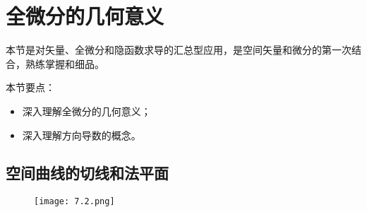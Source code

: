 \section{全微分的几何意义}

本节是对矢量、全微分和隐函数求导的汇总型应用，是空间矢量和微分的第一次结合，熟练掌握和细品。

本节要点：
\begin{itemize}
    \item 深入理解全微分的几何意义；
    \item 深入理解方向导数的概念。
\end{itemize}

\subsection{空间曲线的切线和法平面}

\begin{figure}[h]
\centering
\texttt{[image: 7.2.png]}
\end{figure}

